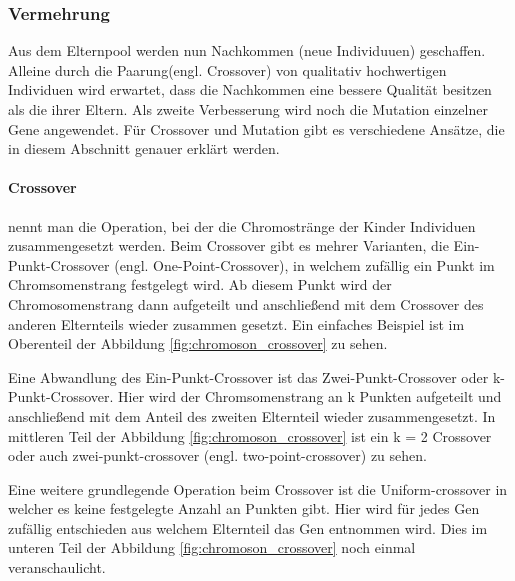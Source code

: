 \subsubsection{Vermehrung}
Aus dem Elternpool werden nun Nachkommen (neue Individuuen) geschaffen. Alleine durch die Paarung(engl. Crossover) von qualitativ hochwertigen Individuen wird erwartet, dass die Nachkommen eine bessere Qualität besitzen als die ihrer Eltern. Als zweite Verbesserung wird noch die Mutation einzelner Gene angewendet. Für Crossover und Mutation gibt es verschiedene Ansätze, die in diesem Abschnitt genauer erklärt werden.

\paragraph{Crossover} nennt man die Operation, bei der die Chromostränge der Kinder Individuen zusammengesetzt werden.
Beim Crossover gibt es mehrer Varianten, die Ein-Punkt-Crossover (engl. One-Point-Crossover), in welchem zufällig ein Punkt im Chromsomenstrang festgelegt wird.
Ab diesem Punkt wird der Chromosomenstrang dann aufgeteilt und anschließend mit dem Crossover des anderen Elternteils wieder zusammen gesetzt. Ein einfaches Beispiel ist im Oberenteil der Abbildung \ref{fig:chromoson_crossover} zu sehen.

Eine Abwandlung des Ein-Punkt-Crossover ist das Zwei-Punkt-Crossover oder k-Punkt-Crossover. Hier wird der Chromsomenstrang an k Punkten aufgeteilt und anschließend mit dem Anteil des zweiten Elternteil wieder zusammengesetzt.
In mittleren Teil der Abbildung \ref{fig:chromoson_crossover}
ist ein k = 2 Crossover oder auch zwei-punkt-crossover (engl. two-point-crossover) zu sehen.

Eine weitere grundlegende Operation beim Crossover ist die Uniform-crossover \cite{Syswerda1989} in welcher es keine festgelegte Anzahl an Punkten gibt. Hier wird für jedes Gen zufällig entschieden aus welchem Elternteil das Gen entnommen wird.
Dies im unteren Teil der Abbildung \ref{fig:chromoson_crossover} noch einmal veranschaulicht.

